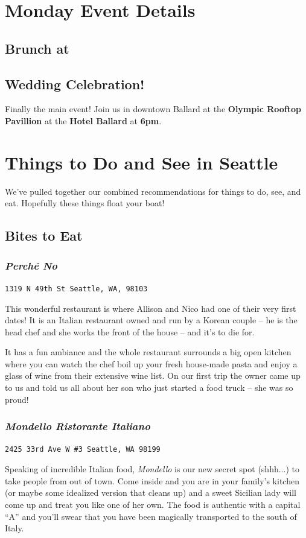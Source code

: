 \documentclass[10pt]{article}
\begin{document}
\newpage
\section{Monday Event Details}
\subsection{Brunch at }
\label{subsec-monday-brunch}

\subsection{Wedding Celebration!}
\label{subsec-wedding}
Finally the main event! Join us in downtown Ballard at the \textbf{Olympic Rooftop Pavillion} at
the \textbf{Hotel Ballard} at \textbf{6pm}.


\newpage
\section{Things to Do and See in Seattle}
\label{sec-things-to-do}
We've pulled together our combined recommendations for things to do, see, and eat.
Hopefully these things float your boat!
\renewcommand\thesubsubsection{\arabic{subsubsection}}

\subsection{Bites to Eat}

\subsubsection{\textit{Perch\'e No}}
\begin{center}
    \texttt{1319 N 49th St Seattle, WA, 98103}
\end{center}
This wonderful restaurant is where Allison and Nico had one of their very first dates!
It is an Italian restaurant owned and run by a Korean couple -- he is the head chef and 
she works the front of the house -- and it's to die for. 

It has a fun ambiance and the whole restaurant surrounds a big open kitchen where you can 
watch the chef boil up your fresh house-made pasta and enjoy a glass of wine from their 
extensive wine list. On our first trip the owner came up to us and told us all about her son 
who just started a food truck -- she was so proud!

\subsubsection{\textit{Mondello Ristorante Italiano}}
\begin{center}
    \texttt{2425 33rd Ave W \#3 Seattle, WA 98199}
\end{center}
Speaking of incredible Italian food, \textit{Mondello} is our new secret spot (shhh...) 
to take people from out of town. Come inside and you are in your family's kitchen (or 
maybe some idealized version that cleans up) and a sweet Sicilian lady will come up and
treat you like one of her own. The food is authentic with a capital ``A'' and you'll 
swear that you have been magically transported to the south of Italy.
\end{document}

